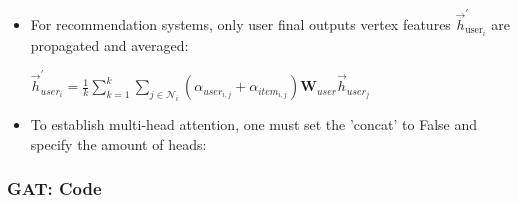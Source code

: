 \documentclass{beamer}
\begin{document}

\begin{frame}[fragile]
\begin{itemize}
\frametitle{(Optional 4) Multi-Head Attention: Case Study}
[ball]

\item For recommendation systems, only user final outputs vertex features $\overrightarrow{h}_{\text{user}_i}^{'}$ are propagated and averaged:

\vspace{0.3cm}

\begin{center}
    $\overrightarrow{h}_{user_{i}}^{'} = \frac{1}{k} \sum_{k=1}^{k} \sum_{j \in \mathcal{N}_{i}} (\alpha_{user_{i,j}}+\alpha_{item_{i,j}}) \textbf{W}_{user}\overrightarrow{h}_{user_{j}}$
\end{center}

\end{itemize}
\end{frame}


\begin{frame}[fragile]
\begin{itemize}
\frametitle{(Optional 4) Multi-Head Attention: Code}
[ball]

\item To establish multi-head attention, one must set the 'concat' to False and specify the amount of heads:

\vspace{0.5cm}



\end{itemize}
\end{frame}


\begin{frame}[fragile]
\frametitle{GAT: Code}



\end{frame}
\end{document}
